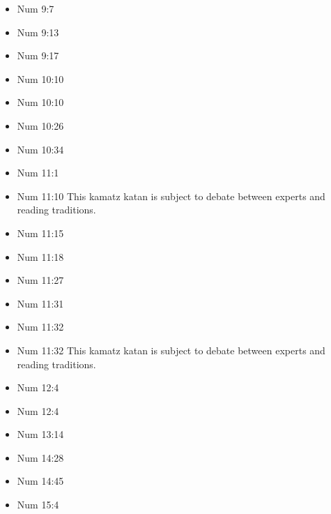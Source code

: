 \documentclass[14pt]{article}
\begin{document}
\begin{multicols}{2}
\begin{itemize}
\item Num 9:7

\item Num 9:13

\item Num 9:17

\item Num 10:10

\item Num 10:10

\item Num 10:26

\item Num 10:34

\item Num 11:1

\item Num 11:10 This kamatz katan is subject to debate between experts and reading traditions.

\item Num 11:15

\item Num 11:18

\item Num 11:27

\item Num 11:31

\item Num 11:32

\item Num 11:32 This kamatz katan is subject to debate between experts and reading traditions.

\item Num 12:4

\item Num 12:4

\item Num 13:14

\item Num 14:28

\item Num 14:45

\item Num 15:4


\end{itemize}
\end{multicols}
\end{document}
